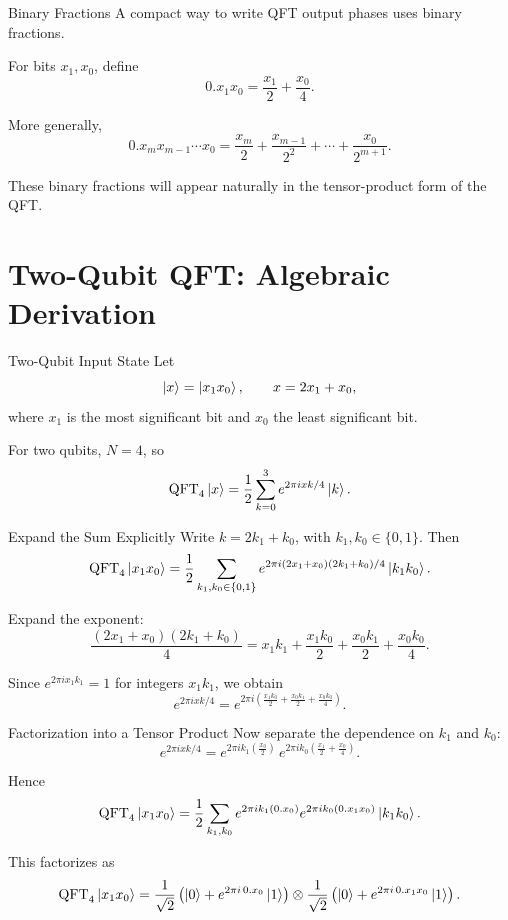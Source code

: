 \documentclass{beamer}
\begin{document}

\begin{frame}{Binary Fractions}
A compact way to write QFT output phases uses binary fractions.

\medskip

For bits \(x_1,x_0\), define
\[
0.x_1x_0 = \frac{x_1}{2}+\frac{x_0}{4}.
\]

More generally,
\[
0.x_{m}x_{m-1}\cdots x_0
=
\frac{x_m}{2}+\frac{x_{m-1}}{2^2}+\cdots+\frac{x_0}{2^{m+1}}.
\]

These binary fractions will appear naturally in the tensor-product form of the QFT.
\end{frame}

\section{Two-Qubit QFT: Algebraic Derivation}

\begin{frame}{Two-Qubit Input State}
Let
\[
\ket{x}=\ket{x_1x_0},
\qquad x=2x_1+x_0,
\]
where \(x_1\) is the most significant bit and \(x_0\) the least significant bit.

For two qubits, \(N=4\), so
\[
\mathrm{QFT}_4 \ket{x}
=
\frac{1}{2}
\sum_{k=0}^{3}
e^{2\pi i xk/4}\ket{k}.
\]
\end{frame}


\begin{frame}{Expand the Sum Explicitly}
Write \(k=2k_1+k_0\), with \(k_1,k_0\in\{0,1\}\). Then
\[
\mathrm{QFT}_4 \ket{x_1x_0}
=
\frac{1}{2}
\sum_{k_1,k_0\in\{0,1\}}
e^{2\pi i (2x_1+x_0)(2k_1+k_0)/4}
\ket{k_1k_0}.
\]

Expand the exponent:
\[
\frac{(2x_1+x_0)(2k_1+k_0)}{4}
=
x_1k_1 + \frac{x_1k_0}{2} + \frac{x_0k_1}{2} + \frac{x_0k_0}{4}.
\]

Since \(e^{2\pi i x_1k_1}=1\) for integers \(x_1k_1\), we obtain
\[
e^{2\pi i xk/4}
=
e^{2\pi i \left( \frac{x_1k_0}{2} + \frac{x_0k_1}{2} + \frac{x_0k_0}{4}\right)}.
\]
\end{frame}


\begin{frame}{Factorization into a Tensor Product}
Now separate the dependence on \(k_1\) and \(k_0\):
\[
e^{2\pi i xk/4}
=
e^{2\pi i k_1 \left(\frac{x_0}{2}\right)}
\,
e^{2\pi i k_0 \left(\frac{x_1}{2}+\frac{x_0}{4}\right)}.
\]

Hence
\[
\mathrm{QFT}_4 \ket{x_1x_0}
=
\frac{1}{2}
\sum_{k_1,k_0}
e^{2\pi i k_1(0.x_0)}
e^{2\pi i k_0(0.x_1x_0)}
\ket{k_1k_0}.
\]

This factorizes as
\[
\mathrm{QFT}_4 \ket{x_1x_0}
=
\frac{1}{\sqrt{2}}
\left(\ket{0}+e^{2\pi i\,0.x_0}\ket{1}\right)
\otimes
\frac{1}{\sqrt{2}}
\left(\ket{0}+e^{2\pi i\,0.x_1x_0}\ket{1}\right).
\]
\end{frame}
\end{document}
